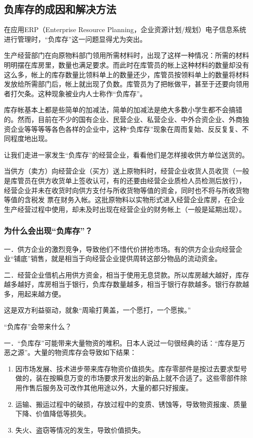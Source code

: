 \subsection { 负库存的成因和解决方法}

  在应用ERP（Enterprise Resource Planning，企业资源计划/规划）电子信息系统进行管理时，“负库存”这一问题显得尤为突出。

    生产经营部门在向原物料部门领用所需材料时，出现了这样一种情况：所需的材料明明摆在库房里，数量也满足要求。而此时在库管员的帐上这种材料的数量却没有这么多，帐上的库存数量比领料单上的数量还少，库管员按领料单上的数量将材料发放给所需部门后，帐上就出现了负数。库管员为了把帐做平，甚至于还要向领用者打欠条。这种现象被业内人士称作“负库存”。

    库存帐基本上都是些简单的加减法，简单的加减法是绝大多数小学生都不会搞错的。然而，目前在不少的国有企业、民营企业、私营企业、中外合资企业、外商独资企业等等等等各色各样的企业中，这种“负库存”现象在周而复始、反反复复、不同程度地出现。

    让我们走进一家发生“负库存”的经营企业，看看他们是怎样接收供方单位送货的。

    当供方（卖方）向经营企业（买方）送上原物料时，经营企业收货人员收货（一般是库管员在供方收货单上签收认可，有的还要由经营企业质检人员检测后放行），经营企业并未在收货时向供方支付与所收货物等值的资金，同时也不将与所收货物等值的含税发 票在财务入帐。这批原物料以实物形式进入经营企业库房，在企业生产经营过程中使用，却未及时出现在经营企业的财务帐上（一般是延期出现）。

\subsubsection {    为什么会出现“负库存”？}

    一．供方企业的激烈竞争，导致他们不惜代价拼抢市场。有的供方企业向经营企业“铺底”销售，就是相当于向经营企业提供周转这部分物品的流动资金。

    二．经营企业借机占用供方资金，相当于使用无息贷款。所以库房越大越好，库存越多越好，库房相当于银行，负库存数量越多，相当于银行存款越多。银行存款越多，用起来越方便。

    这是双方利益驱动，就象“周瑜打黄盖，一个愿打，一个愿挨。”

    “负库存”会带来什么？

    一．“负库存”可能带来大量物资的堆积。日本人说过一句很经典的话：“库存是万恶之源”。大量的物资库存会导致如下结果：

    \begin{enumerate}
        \item  因市场发展、技术进步带来库存物资价值损失。库存零部件是按过去要求型号做的，装在按瞬息万变的市场要求开发出的新品上就不合适了。这些零部件除用作售后服务及可改作其他用途以外，大量的都只好报废。
        \item  运输、搬运过程中的破损，存放过程中的变质、锈蚀等，导致物资报废、质量下降、价值降低等损失。
        \item  失火、盗窃等情况的发生，导致价值损失。
    \end{enumerate}

